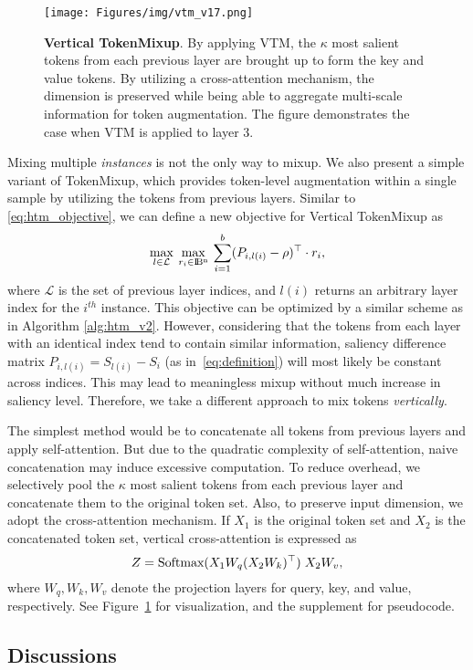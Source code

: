 \documentclass{article}
\begin{document}
\begin{figure}[t]
\begin{center}
\texttt{[image: Figures/img/vtm\_v17.png]}
\end{center}
\vspace{-4mm}
\caption{\footnotesize \textbf{Vertical TokenMixup}. By applying VTM, the $\kappa$ most salient tokens from each previous layer are brought up to form the key and value tokens. By utilizing a cross-attention mechanism, the dimension is preserved while being able to aggregate multi-scale information for token augmentation. The figure demonstrates the case when VTM is applied to layer 3. }
\label{fig:vtm}
\end{figure} Mixing multiple \textit{instances} is not the only way to mixup.
We also present a simple variant of TokenMixup, which 
provides token-level augmentation within a single sample by utilizing the tokens from previous layers.
Similar to \eqref{eq:htm_objective}, we can define a new objective for Vertical TokenMixup as
\begin{equation}
    \max_{l \in \mathcal{L}} \: \max_{r_i \in \rm I\!B^n} \: \displaystyle \sum _{i=1}^b (P_{i, l(i)}-\rho)^\top \cdot r_i ,
\end{equation}
where $\mathcal{L}$ is the set of previous layer indices, and $l(i)$ returns an arbitrary layer index for the $i^{th}$ instance.
This objective can be optimized by a similar scheme as in Algorithm \ref{alg:htm_v2}.
However, considering that the tokens from each layer with an identical index tend to contain similar information, saliency difference matrix $P_{i,l(i)} = S_{l(i)} - S_i$ (as in~\eqref{eq:definition}) will most likely be constant across indices.
This may lead to meaningless mixup without much increase in saliency level.
Therefore, we take a different approach to mix tokens \textit{vertically}.

The simplest method would be to concatenate all tokens from previous layers and apply self-attention.
But due to the quadratic complexity of self-attention, naive concatenation may induce excessive computation.
To reduce overhead, we selectively pool the $\kappa$ most salient tokens from each previous layer and concatenate them to the original token set.
Also, to preserve input dimension, we adopt the cross-attention mechanism.
If $X_1$ is the original token set and $X_2$ is the concatenated token set, vertical cross-attention is expressed as
\begin{equation}
    Z = \textrm{Softmax}(X_1 W_q  (X_2 W_k)^\top) \hspace{1mm} X_2 W_v,
\end{equation}
where $W_q, W_k, W_v$ denote the projection layers for query, key, and value, respectively.
See Figure~\ref{fig:vtm} for visualization, and the supplement for pseudocode. \subsection{Discussions}
\end{document}
